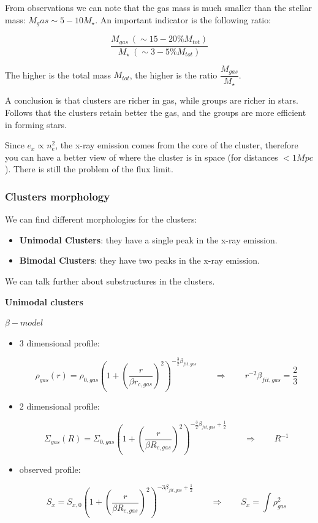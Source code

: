 From observations we can note that the gas mass is much smaller than the stellar mass: $M_gas \sim 5-10 M_{\star}$. An important indicator is the following ratio:

$$
\dfrac{M_{gas} \ (\sim 15 - 20\% M_{tot})}{M_{\star} \ (\sim 3-5\% M_{tot})}
$$

The higher is the total mass $M_{tot}$, the higher is the ratio $\dfrac{M_{gas}}{M_{\star}}$.

A conclusion is that clusters are richer in gas, while groups are richer in stars. Follows that the clusters retain better the gas, and the groups are more efficient in forming stars.

Since $e_x \propto n_e^2$, the x-ray emission comes from the core of the cluster, therefore you can have a better view of where the cluster is in space (for distances $< 1 Mpc$). There is still the problem of the flux limit.

\subsubsection{Clusters morphology}

We can find different morphologies for the clusters:

\begin{itemize}
    \item \textbf{Unimodal Clusters}: they have a single peak in the x-ray emission.
    \item \textbf{Bimodal Clusters}: they have two peaks in the x-ray emission.
\end{itemize}

We can talk further about substructures in the clusters.

\textbf{Unimodal clusters}

$\beta-model$

\begin{itemize}
    \item 3 dimensional profile:

    $$
    \rho_{gas}(r) = \rho_{0, gas} \left( 1 + \left( \dfrac{r}{\beta r_{c, gas}} \right)^2 \right)^{-\frac{3}{2} \beta_{fit, gas}}
    \qquad \Rightarrow \qquad 
    r^{-2} \beta_{fit, gas} = \dfrac 23
    $$

    \item 2 dimensional profile:
    
    $$
    \Sigma_{gas}(R) = \Sigma_{0, gas} \left( 1 + \left( \dfrac{r}{\beta R_{c, gas}} \right)^2 \right)^{-\frac{3}{2} \beta_{fit, gas} + \frac 12}
    \qquad \Rightarrow \qquad 
    R^{-1}
    $$
    
    \item observed profile:
    
    $$
    S_x = S_{x, 0} \left( 1 + \left( \dfrac{r}{\beta R_{c, gas}} \right)^2 \right)^{-3 \beta_{fit, gas} + \frac 12}
    \qquad \Rightarrow \qquad 
    S_x = \int \rho_{gas}^2
    $$
\end{itemize}


